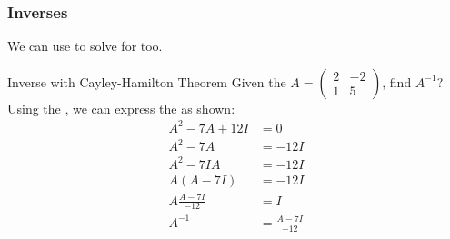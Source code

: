 \subsubsection{Inverses}\label{subsubsec:Cayley-Hamilton_Inverses}
We can use  to solve for  too.
\begin{example}{Inverse with Cayley-Hamilton Theorem}
  Given the  $A =
  \begin{pmatrix}
    2 & -2 \\
    1 & 5
  \end{pmatrix}$, find $A^{-1}$?
  Using the , we can express the  as shown:
  \begin{align*}
    A^{2} - 7A + 12I &= 0 \\
    A^{2} - 7A &= -12I \\
    A^{2} - 7IA &= -12I \\
    A (A - 7I) &= -12I \\
    A \frac{A-7I}{-12} &= I \\
    A^{-1} &= \frac{A-7I}{-12}
  \end{align*}
\end{example}

